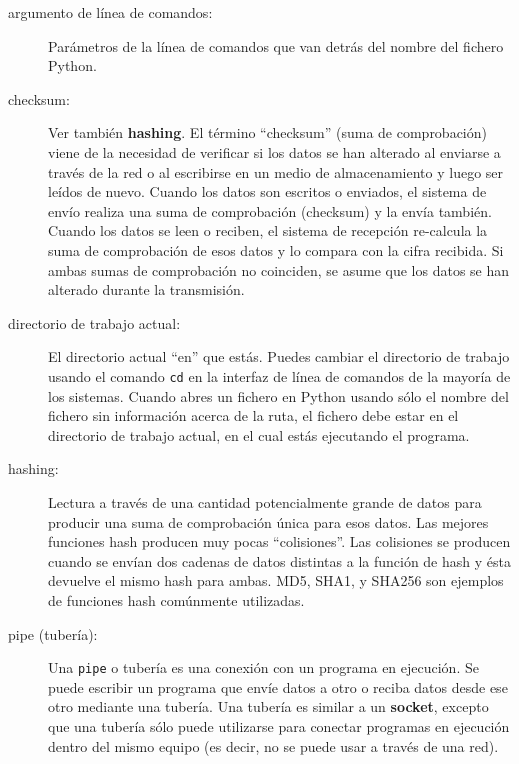 \begin{description}

\item[argumento de línea de comandos:] Parámetros de la línea de comandos que van detrás del nombre
del fichero Python.

\item[checksum:] Ver también {\bf hashing}.  El término ``checksum'' (suma de comprobación)
viene de la necesidad de verificar si los datos se han alterado al
enviarse a través de la red o al escribirse en un medio de almacenamiento y luego
ser leídos de nuevo. Cuando los datos son escritos o enviados, el sistema de envío
realiza una suma de comprobación (checksum) y la envía también. Cuando los
datos se leen o reciben, el sistema de recepción re-calcula la suma de comprobación
de esos datos y lo compara con la cifra recibida. Si ambas sumas de comprobación no coinciden,
se asume que los datos se han alterado durante la transmisión.

\item[directorio de trabajo actual:] El directorio actual ``en''
que estás. Puedes cambiar el directorio de trabajo usando el comando
{\tt cd} en la interfaz de línea de comandos de la mayoría de los sistemas.
Cuando abres un fichero en Python usando sólo el nombre del fichero sin información
acerca de la ruta, el fichero debe estar en el directorio de trabajo actual,
en el cual estás ejecutando el programa.

\item[hashing:] Lectura a través de una cantidad potencialmente grande de datos
para producir una suma de comprobación única para esos datos. Las mejores funciones hash
producen muy pocas ``colisiones''. Las colisiones se producen cuando se envían dos cadenas de datos
distintas a la función de hash y ésta devuelve el mismo hash para ambas.
MD5, SHA1, y SHA256 son ejemplos de funciones hash comúnmente utilizadas.

\item[pipe (tubería):] Una {\tt pipe} o tubería es una conexión con un programa en ejecución. Se
puede escribir un programa que envíe datos a otro o reciba datos desde ese otro
mediante una tubería. Una tubería es similar a un
{\bf socket}, excepto que una tubería sólo puede utilizarse
para conectar programas en ejecución dentro del mismo equipo
(es decir, no se puede usar a través de una red).


\end{description}
